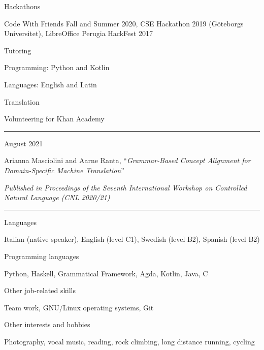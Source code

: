 \documentclass[a4paper,10pt]{article}
\newlength{\cvcolumngapwidth}
\newlength{\cvleftcolumnwidth}
\newlength{\cvrightcolumnwidth}
\newcommand{\cvsectionstyle}[1]{{\normalsize\cvsectionfont\textcolor{cvsectioncolor}{#1}}}
\newcommand{\cvtitlestyle}[1]{{\large\cvtitlefont\textcolor{cvtitlecolor}{#1}}}
\newcommand{\cvdurationstyle}[1]{{\small\cvdurationfont\textcolor{cvdurationcolor}{#1}}}
\newcommand{\cvheadingstyle}[1]{{\normalsize\cvheadingfont\textcolor{cvheadingcolor}{#1}}}
\newlength{\cvafteritemskipamount}
\newlength{\cvaftersectionskipamount}
\newlength{\cvbetweensectionandheadingextraskipamount}
\newlength{\cvaftertitleskipamount}
\newlength{\cvparskip}
\newcommand{\cvsection}[1]{
    \begin{minipage}[t]{\cvleftcolumnwidth}
        \raggedleft\cvsectionstyle{#1}
    \end{minipage}%
    \hspace{\cvcolumngapwidth}%
    \begin{minipage}[t]{\cvrightcolumnwidth}
        \textcolor{cvrulecolor}{\rule{\cvrightcolumnwidth}{0.3mm}}
    \end{minipage}

    \vspace{\cvaftersectionskipamount}
}
\newcommand{\cvitem}[2]{
    \begin{minipage}[t]{\cvleftcolumnwidth}
        \raggedleft #1
    \end{minipage}%
    \hspace{\cvcolumngapwidth}%
    \begin{minipage}[t]{\cvrightcolumnwidth}
        \setlength{\parskip}{\cvparskip} #2
    \end{minipage}

    \vspace{\cvafteritemskipamount}
}
\newcommand{\cvtitle}[1]{
    \cvtitlestyle{#1}

    \vspace{\cvaftertitleskipamount}
    \vspace{-\cvparskip}
}
\begin{document}
\cvitem{
    \cvheadingstyle{Hackathons}
}{
    Code With Friends Fall and Summer 2020, CSE Hackathon 2019 (Göteborgs Universitet), LibreOffice Perugia HackFest 2017 
}

\cvitem{
    \cvheadingstyle{Tutoring}
}{
    Programming: Python and Kotlin

    Languages: English and Latin
}

\cvitem{
    \cvheadingstyle{Translation}
}{
    Volunteering for Khan Academy
}

\cvsection{PUBLICATIONS}
\cvitem{
    \cvdurationstyle{August 2021}
}{
    \cvtitle{Arianna Masciolini and Aarne Ranta, ``\textit{Grammar-Based Concept Alignment for Domain-Specific Machine Translation}''}
    
    \textit{Published in Proceedings of the Seventh International Workshop on Controlled Natural Language (CNL 2020/21)}
}


\cvsection{SKILLS AND INTERESTS}

\vspace{\cvbetweensectionandheadingextraskipamount}

\cvitem{
    \cvheadingstyle{Languages}
}{
    Italian (native speaker), English (level C1), Swedish (level B2), Spanish (level B2)
}

\cvitem{
    \cvheadingstyle{Programming languages}
}{
    Python, Haskell, Grammatical Framework, Agda, Kotlin, Java, C
}

\cvitem{
    \cvheadingstyle{Other job-related skills}
}{
    Team work, GNU/Linux operating systems, Git
}

\cvitem{
    \cvheadingstyle{Other interests and hobbies}
}{
    Photography, vocal music, reading, rock climbing, long distance running, cycling
}
\end{document}
